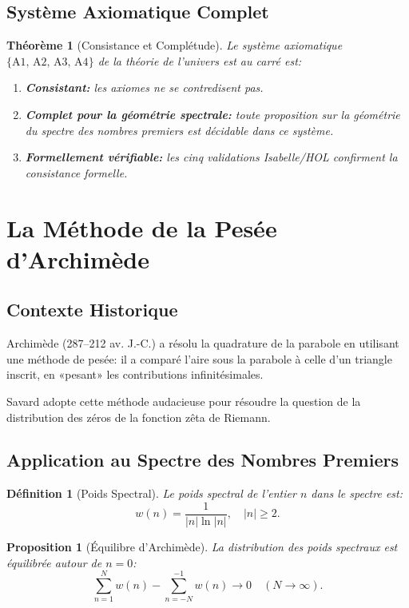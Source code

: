 \documentclass[12pt,a4paper]{article}
\newtheorem{theoreme}{Théorème}
\newtheorem{proposition}{Proposition}
\newtheorem{definition}{Définition}
\begin{document}
\subsection{Système Axiomatique Complet}

\begin{theoreme}[Consistance et Complétude]
Le système axiomatique $\{\text{A1, A2, A3, A4}\}$ de la théorie de l'univers est
au carré est:
\begin{enumerate}
  \item \textbf{Consistant:} les axiomes ne se contredisent pas.
  \item \textbf{Complet pour la géométrie spectrale:} toute proposition sur la
        géométrie du spectre des nombres premiers est décidable dans ce système.
  \item \textbf{Formellement vérifiable:} les cinq validations Isabelle/HOL
        confirment la consistance formelle.
\end{enumerate}
\end{theoreme}

\section{La Méthode de la Pesée d'Archimède}

\subsection{Contexte Historique}

Archimède (287–212 av. J.-C.) a résolu la quadrature de la parabole en utilisant
une méthode de pesée: il a comparé l'aire sous la parabole à celle d'un triangle
inscrit, en «pesant» les contributions infinitésimales.

Savard adopte cette méthode audacieuse pour résoudre la question de la distribution
des zéros de la fonction zêta de Riemann.

\subsection{Application au Spectre des Nombres Premiers}

\begin{definition}[Poids Spectral]
Le \emph{poids spectral} de l'entier $n$ dans le spectre est:
\[
  w(n) = \frac{1}{|n| \ln |n|}, \quad |n| \geq 2.
\]
\end{definition}

\begin{proposition}[Équilibre d'Archimède]
La distribution des poids spectraux est équilibrée autour de $n = 0$:
\[
  \sum_{n=1}^{N} w(n) - \sum_{n=-N}^{-1} w(n) \longrightarrow 0 \quad (N \to \infty).
\]
\end{proposition}
\end{document}
